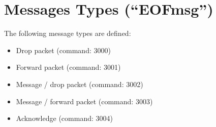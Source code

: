 \section{Messages Types ("`EOFmsg"')}
\label{eofmsg}
The following message types are defined:

\begin{itemize}
\item Drop packet (command: 3000)
\item Forward packet (command: 3001)
\item Message / drop packet (command: 3002)
\item Message / forward packet (command: 3003)
\item Acknowledge (command: 3004)
\end{itemize}
